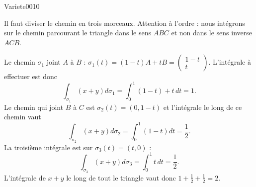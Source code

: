 
\begin{corrige}{Variete0010}

    Il faut diviser le chemin en trois morceaux. Attention à l'ordre : nous intégrons sur le chemin parcourant le triangle dans le sens $ABC$ et non dans le sens inverse $ACB$.

    Le chemin $\sigma_1$ joint $A$ à $B$ : $\sigma_1(t)=(1-t)A+tB=\begin{pmatrix}
        1-t    \\ 
        t    
    \end{pmatrix}$. L'intégrale à effectuer est donc
    \begin{equation}
        \int_{\sigma_1}(x+y)d\sigma_1=\int_0^1(1-t)+t\,dt=1.
    \end{equation}
    Le chemin qui joint $B$ à $C$ est $\sigma_2(t)=(0,1-t)$ et l'intégrale le long de ce chemin vaut
    \begin{equation}
        \int_{\sigma_2}(x+y)d\sigma_2=\int_0^1(1-t)dt=\frac{ 1 }{2}.
    \end{equation}
    La troisième intégrale est sur $\sigma_3(t)=(t,0)$ :
    \begin{equation}
        \int_{\sigma_3}(x+y)d\sigma_3=\int_0^1t\,dt=\frac{ 1 }{2}.
    \end{equation}
    L'intégrale de $x+y$ le long de tout le triangle vaut donc $1+\frac{ 1 }{2}+\frac{ 1 }{2}=2$.

\end{corrige}
